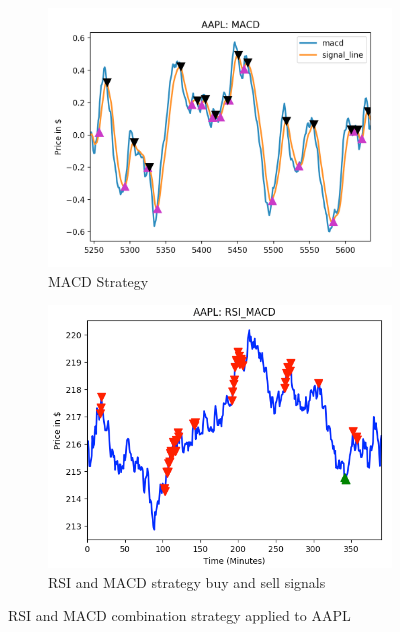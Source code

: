 \documentclass[letterpaper,11pt]{article}
\begin{document}
\begin{figure}[h]
\centering

\begin{subfigure}[t]{0.45\textwidth}
\includegraphics[width=\textwidth]{AAPL_MACD.png}
\caption{MACD Strategy \label{overflow}}
\end{subfigure}
\begin{subfigure}[t]{0.45\textwidth}
\includegraphics[width=\textwidth]{AAPL_RSIxMACD.png}
\caption{RSI and MACD strategy buy and sell signals \label{overflow}}
\end{subfigure}

\caption{RSI and MACD combination strategy applied to AAPL  \label{overflow}}
\label{RSIMACDfigure}
\end{figure}
\end{document}

